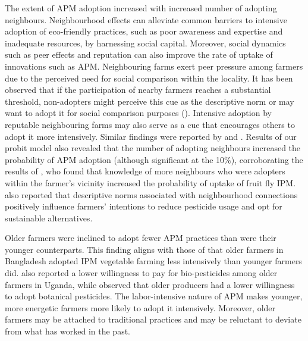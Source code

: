 \documentclass[fleqn,twoside,reqno]{article}
\begin{document}
The extent of APM adoption increased with increased number of adopting neighbours. Neighbourhood effects can alleviate common barriers to intensive adoption of eco-friendly practices, such as poor awareness and expertise and inadequate resources, by harnessing social capital. Moreover, social dynamics such as peer effects and reputation can also improve the rate of uptake of innovations such as APM. Neighbouring farms exert peer pressure among farmers due to the perceived need for social comparison within the locality. It has been observed that if the participation of nearby farmers reaches a substantial threshold, non-adopters might perceive this cue as the descriptive norm or may want to adopt it for social comparison purposes (\cite{Despotovic2019, Dessart2019, Ejelov2022}). Intensive adoption by reputable neighbouring farms may also serve as a cue that encourages others to adopt it more intensively. Similar findings were reported by \cite{Misango2022} and \cite{Alhassan2023}. Results of our probit model also revealed that the number of adopting neighbours increased the probability of APM adoption (although significant at the 10\%), corroborating the results of \cite{Midingoyi2019}, who found that knowledge of more neighbours who were adopters within the farmer’s vicinity increased the probability of uptake of fruit fly IPM. \cite{Bakker2021} also reported that descriptive norms associated with neighbourhood connections positively influence farmers’ intentions to reduce pesticide usage and opt for sustainable alternatives.  

Older farmers were inclined to adopt fewer APM practices than were their younger counterparts. This finding aligns with those of \cite{Kabir2015} that older farmers in Bangladesh adopted IPM vegetable farming less intensively than younger farmers did. \cite{Nyangau2022} also reported a lower willingness to pay for bio-pesticides among older farmers in Uganda, while \cite{Kabir2022} observed that older producers had a lower willingness to adopt botanical pesticides. The labor-intensive nature of APM makes younger, more energetic farmers more likely to adopt it intensively. Moreover, older farmers may be attached to traditional practices and may be reluctant to deviate from what has worked in the past. 
\end{document}
